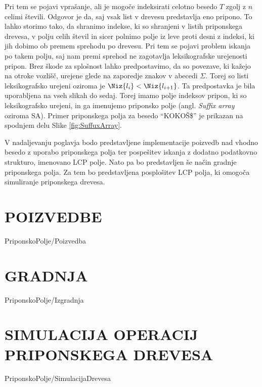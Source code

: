 Pri tem se pojavi vprašanje, ali je mogoče indeksirati celotno besedo $T$ zgolj z $n$ celimi števili. Odgovor je da, saj vsak list v drevesu predstavlja eno pripono. To lahko storimo tako, da shranimo indekse, ki so shranjeni v listih priponskega drevesa, v polju celih števil in sicer polnimo polje iz leve proti desni z indeksi, ki jih dobimo ob premem sprehodu po drevesu. Pri tem se pojavi problem iskanja po takem polju, saj nam premi sprehod ne zagotavlja leksikografske urejenosti pripon. Brez škode za splošnost lahko predpostavimo, da so povezave, ki kažejo na otroke vozlišč, urejene glede na zaporedje znakov v abecedi $\Sigma$. Torej so listi leksikografsko urejeni oziroma je $\Niz{l_i}<\Niz{l_{i+1}}$. Ta predpostavka je bila uporabljena na vseh slikah do sedaj. Torej imamo polje indeksov pripon, ki so leksikografsko urejeni, in ga imenujemo priponsko polje (angl. \textit{Suffix array} oziroma SA). Primer priponskega polja za besedo \enquote{KOKOŠ\$} je prikazan na spodnjem delu Slike \ref{fig:SuffuxArray}. 

V nadaljevanju poglavja bodo predstavljene implementacije poizvedb nad vhodno besedo z uporabo priponskega polja ter pospešitev iskanja z dodatno podatkovno strukturo, imenovano LCP polje. Nato pa bo predstavljen še način gradnje priponskega polja. Za tem bo predstavljena posplošitev LCP polja, ki omogoča simuliranje priponskega drevesa. 


\section{POIZVEDBE}\label{sec:SAPoizvedbe}
{PriponskoPolje/Poizvedba}


\section{GRADNJA}\label{sec:SAIzgradnja}
{PriponskoPolje/Izgradnja}

\section{SIMULACIJA OPERACIJ PRIPONSKEGA DREVESA}\label{sec:STsimulacija}
{PriponskoPolje/SimulacijaDrevesa}